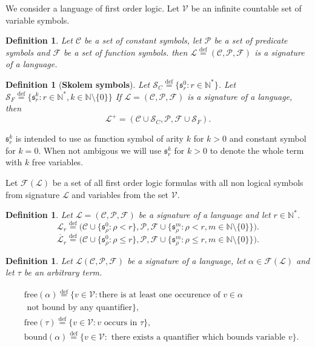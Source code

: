 \documentclass[10pt]{article}
\theoremstyle{plain}
\newtheorem{definition}[theorem]{Definition}
\newcommand{\defeq}{\stackrel{\mathrm{def}}{=}}
\newcommand{\free}{\text{free}}
\newcommand{\bound}{\text{bound}}
\newcommand{\Sk}{\mathcal{S}}
\newcommand{\sk}{\mathfrak{s}}
\newcommand{\N}{\mathbb{N}}
\newcommand{\F}{\mathcal{F}}
\renewcommand{\L}{\mathscr{L}}
\newcommand{\V}{\mathscr{V}}
\begin{document}
We consider a language of first order logic.
Let $\V$ be an infinite countable set of variable symbols.

\begin{definition}
Let $\mathscr{C}$ be a set of constant symbols, let $\mathscr{P}$ be a set of predicate symbols and $\mathscr{F}$ be a set of function symbols. 
then $\L \defeq (\mathscr{C}, \mathscr{P}, \mathscr{F})$ is a signature of a language.
\end{definition}


\begin{definition}[\textbf{Skolem symbols}]
Let  $\Sk_C \defeq \{\sk_r^0: r\in \N^*\}$.
Let $\Sk_F \defeq \{\sk_r^k: r\in \N^*, k\in \N\setminus\{0\}\}$
If $\L = (\mathscr{C}, \mathscr{P}, \mathscr{F})$ is a signature of a language, then
$$
\L^+ = (\mathscr{C} \cup \Sk_C, \mathscr{P}, \mathscr{F} \cup \Sk_F).
$$
\end{definition}

$\sk^k_r$ is intended to use as function symbol of arity $k$ for $k > 0$ and constant symbol for $k=0$. When not ambigous we will use $\sk^k_r$ for $k > 0$ to denote the whole term with $k$ free variables.


Let $\F(\L)$ be a set of all first order logic formulas with all non logical symbols from signature $\L$ and variables from the set $\V$.

\begin{definition}
Let $\L = (\mathscr{C}, \mathscr{P}, \mathscr{F})$ be a signature of a language and let $r\in\N^*$.
\begin{equation}
\L_r \defeq \bigg(\mathscr{C} \cup \big\{\sk^0_\rho: \rho < r\big\}, \mathscr{P}, \mathscr{F}
\cup \bigg\{\sk^m_\rho: \rho < r, m\in\N\setminus\{0\}\bigg\}
\bigg).
\end{equation}
\begin{equation}
\overline{\L}_r \defeq \bigg(\mathscr{C} \cup \big\{\sk^0_\rho: \rho \leq r\big\}, \mathscr{P}, \mathscr{F}
\cup \bigg\{\sk^m_\rho: \rho \leq r, m\in\N\setminus\{0\}\bigg\}
\bigg).
\end{equation}
\end{definition}

\begin{definition}
Let $\L(\mathscr{C}, \mathscr{P}, \mathscr{F})$ be a signature of a language, let $\alpha\in\F(\L)$ and let $\tau$ be an arbitrary term.


\begin{align}
&\free(\alpha)
\defeq \{v\in\V: \text{there is at least one occurence of } v \in \alpha \\ 
& \text{ not bound by any quantifier} \},\\
&\free(\tau) \defeq  \{v\in\V: v \text{ occurs in } \tau\},\\
&\bound(\alpha) \defeq \{v\in\V: \text{ there exists a quantifier which bounds variable } v\}.
\end{align}


\end{definition}
\end{document}
